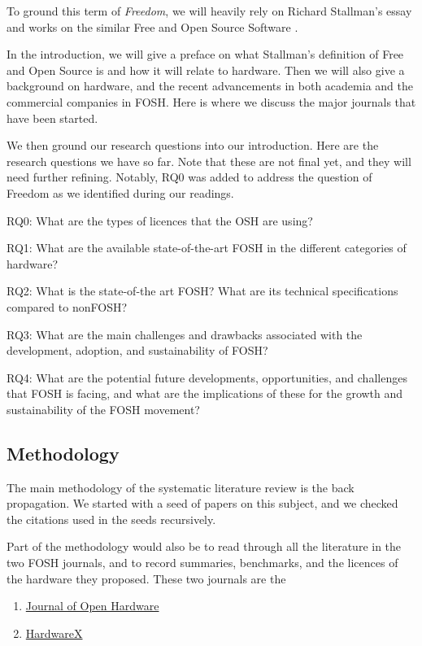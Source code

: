\documentclass{article}
\begin{document}
To ground this term of \textit{Freedom}, 
we will heavily rely on Richard Stallman's essay and works on the similar Free and Open Source Software \cite{b0_stallman}.

In the introduction, we will give a preface on what Stallman's definition of Free and Open Source is and how it will relate to hardware.
Then we will also give a background on hardware, and the recent advancements in both academia and the commercial companies in FOSH.
Here is where we discuss the major journals that have been started. 

We then ground our research questions into our introduction.
Here are the research questions we have so far. 
Note that these are not final yet, and they will need further refining.
Notably, RQ0 was added to address the question of Freedom as we identified during our readings. 

RQ0: What are the types of licences that the OSH are using?

RQ1: What are the available state-of-the-art FOSH in the different categories of hardware?

RQ2: What is the state-of-the art FOSH? What are its technical specifications compared to nonFOSH? 

RQ3: What are the main challenges and drawbacks associated with the development, adoption, and sustainability of FOSH?

RQ4: What are the potential future developments, opportunities, and challenges that FOSH is facing, and what are the implications of these for the growth and sustainability of the FOSH movement?

\subsection{Methodology}
The main methodology of the systematic literature review is the back propagation. 
We started with a seed of papers on this subject, and we checked the citations used in the seeds recursively. 

Part of the methodology would also be to read through all the literature in the two FOSH journals, and to record summaries, benchmarks, and the licences of the hardware they proposed.
These two journals are the 
\begin{enumerate}
    \item \href{https://openhardware.metajnl.com/}{Journal of Open Hardware}
    \item \href{https://www.sciencedirect.com/journal/hardwarex}{HardwareX}
\end{enumerate}
\end{document}
